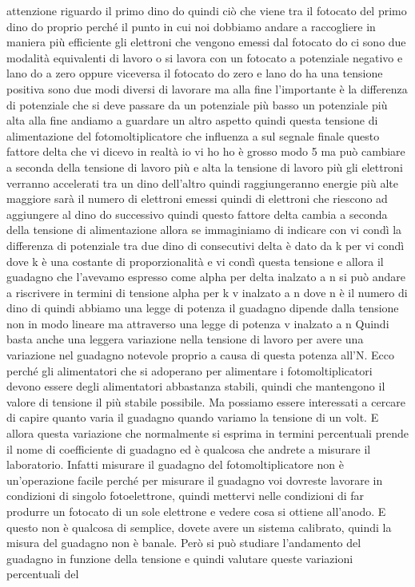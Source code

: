 attenzione riguardo il primo dino do quindi ciò che viene tra il fotocato del primo dino do proprio perché il punto in cui noi dobbiamo andare a raccogliere in maniera più efficiente gli elettroni che vengono emessi dal fotocato do ci sono due modalità equivalenti di lavoro o si lavora con un fotocato a potenziale negativo e lano do a zero oppure viceversa il fotocato do zero e lano do ha una tensione positiva sono due modi diversi di lavorare ma alla fine l'importante è la differenza di potenziale che si deve passare da un potenziale più basso un potenziale più alta alla fine andiamo a guardare un altro aspetto quindi questa tensione di alimentazione del fotomoltiplicatore che influenza a sul segnale finale questo fattore delta che vi dicevo in realtà io vi ho ho è grosso modo 5 ma può cambiare a seconda della tensione di lavoro più e alta la tensione di lavoro più gli elettroni verranno accelerati tra un dino dell'altro quindi raggiungeranno energie più alte maggiore sarà il numero di elettroni emessi quindi di elettroni che riescono ad aggiungere al dino do successivo quindi questo fattore delta cambia a seconda della tensione di alimentazione allora se immaginiamo di indicare con vi condì la differenza di potenziale tra due dino di consecutivi delta è dato da k per vi condì dove k è una costante di proporzionalità e vi condì questa tensione e allora il guadagno che l'avevamo espresso come alpha per delta inalzato a n si può andare a riscrivere in termini di tensione alpha per k v inalzato a n dove n è il numero di dino di quindi abbiamo una legge di potenza il guadagno dipende dalla tensione non in modo lineare ma attraverso una legge di potenza v inalzato a n Quindi basta anche una leggera variazione nella tensione di lavoro per avere una variazione nel guadagno notevole proprio a causa di questa potenza all'N. Ecco perché gli alimentatori che si adoperano per alimentare i fotomoltiplicatori devono essere degli alimentatori abbastanza stabili, quindi che mantengono il valore di tensione il più stabile possibile. Ma possiamo essere interessati a cercare di capire quanto varia il guadagno quando variamo la tensione di un volt. E allora questa variazione che normalmente si esprima in termini percentuali prende il nome di coefficiente di guadagno ed è qualcosa che andrete a misurare il laboratorio. Infatti misurare il guadagno del fotomoltiplicatore non è un'operazione facile perché per misurare il guadagno voi dovreste lavorare in condizioni di singolo fotoelettrone, quindi mettervi nelle condizioni di far produrre un fotocato di un sole elettrone e vedere cosa si ottiene all'anodo. E questo non è qualcosa di semplice, dovete avere un sistema calibrato, quindi la misura del guadagno non è banale. Però si può studiare l'andamento del guadagno in funzione della tensione e quindi valutare queste variazioni percentuali del

